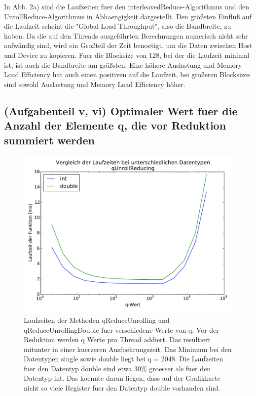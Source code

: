 \documentclass[10pt,a4paper]{article}
\begin{document}
In Abb. 2a) sind die Laufzeiten fuer den interleavedReduce-Algorithmus und den UnrollReduce-Algorithmus in Abhaengigkeit
dargestellt. Den größsten Einfluß auf die Laufzeit scheint die "Global Load Throughput", also die Bandbreite, zu haben. 
Da die auf den Threads ausgeführten Berechnungen numerisch nicht sehr aufwändig sind, wird ein Großteil der Zeit benoetigt,
um die Daten zwischen Host und Device zu kopieren. 
Fuer die Blocksize von 128, bei der die Laufzeit minimal ist, ist auch die Bandbreite am größsten.
Eine höhere Auslastung und Memory Load Efficiency hat auch einen positiven auf die Laufzeit, bei größeren Blocksizes 
sind sowohl Auslastung und Memory Load Efficiency höher. 



\subsection{(Aufgabenteil v, vi) \newline Optimaler Wert fuer die Anzahl der Elemente q, die vor Reduktion
  summiert werden}

\begin{figure}[H]
  \centering
  \includegraphics[width=\textwidth]{../figures/laufzeiten_qunroll_int_double.pdf}
  \caption{Laufzeiten der Methoden qReduceUnrolling und qReduceUnrollingDouble
    fuer verschiedene Werte von q. Vor der Reduktion werden q Werte pro Thread
    addiert. Das resultiert mitunter in einer kuerzeren Ausfuehrungszeit. Das
    Minimum bei den Datentypen single sowie double liegt bei q = 2048. Die
    Laufzeiten fuer den Datentyp double sind etwa 30\% groesser als fuer den
    Datentyp int. Das koennte daran liegen, dass auf der Grafikkarte nicht so
    viele Register fuer den Datentyp double vorhanden sind.}
  \label{fig:optimaler_q}
\end{figure}
\end{document}
